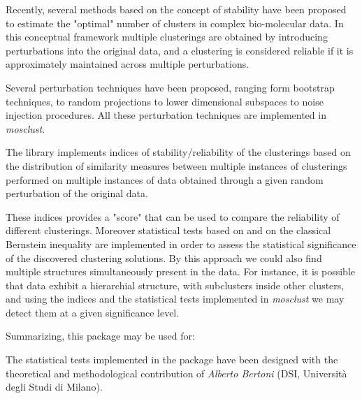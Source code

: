 \documentclass{article}
\begin{document}
\begin{Details}\relax
{}


Recently, several methods based on the concept of stability have been proposed to estimate the "optimal" number of clusters in
complex bio-molecular data. In this conceptual framework multiple clusterings are obtained by introducing
perturbations into the original data, and a clustering is considered reliable if it is approximately maintained across multiple
perturbations.

Several perturbation techniques have been proposed, ranging form bootstrap techniques, to random projections to lower dimensional
subspaces to noise injection procedures. All these perturbation techniques are implemented in \emph{mosclust}.

The library implements indices of stability/reliability of the clusterings based on the distribution of similarity measures between multiple instances of
clusterings performed on multiple instances of data obtained through a given random perturbation of the original data.

These indices provides a "score" that can be used to compare the reliability of different clusterings. 
Moreover statistical tests based on  and on the classical Bernstein inequality are implemented in order to assess the statistical
significance of the discovered clustering solutions. By this approach we could also find multiple structures simultaneously present in the data. For instance,
it is possible that data exhibit a hierarchial structure, with subclusters inside other clusters, and using the indices and the statistical tests
implemented in \emph{mosclust} we may detect them at a given significance level.

Summarizing, this package may be used for:

The statistical tests implemented in the package have been designed with the theoretical and methodological contribution of
\emph{Alberto Bertoni} (DSI, Universit\`a degli Studi di Milano).
\end{Details}
\end{document}
